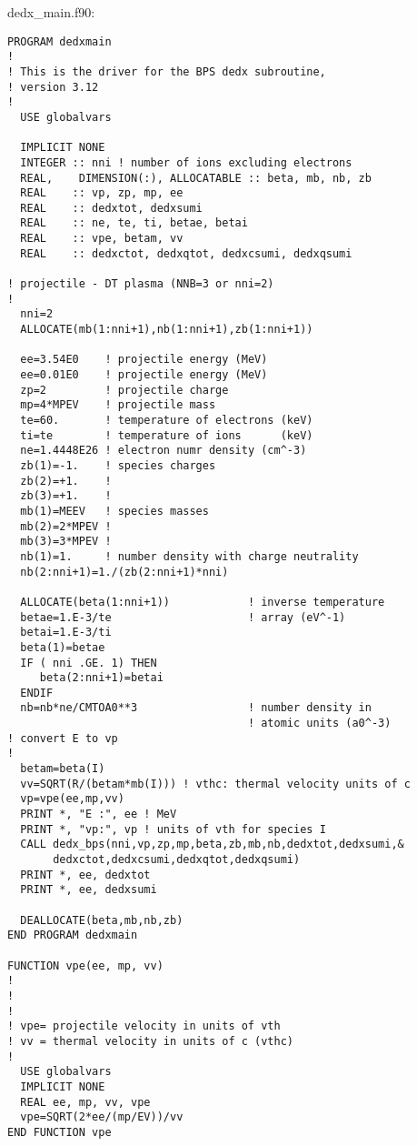 \documentclass[preprint,12pt,eqsecnum,nofootinbib,amsmath,amssymb]{revtex4}
\begin{document}
\vskip0.5cm
{
\noindent
dedx\_main.f90:
\baselineskip12pt
\begin{verbatim}
PROGRAM dedxmain
!
! This is the driver for the BPS dedx subroutine,
! version 3.12
!
  USE globalvars

  IMPLICIT NONE
  INTEGER :: nni ! number of ions excluding electrons
  REAL,    DIMENSION(:), ALLOCATABLE :: beta, mb, nb, zb
  REAL    :: vp, zp, mp, ee
  REAL    :: dedxtot, dedxsumi
  REAL    :: ne, te, ti, betae, betai
  REAL    :: vpe, betam, vv
  REAL    :: dedxctot, dedxqtot, dedxcsumi, dedxqsumi

! projectile - DT plasma (NNB=3 or nni=2)
!
  nni=2         
  ALLOCATE(mb(1:nni+1),nb(1:nni+1),zb(1:nni+1))

  ee=3.54E0    ! projectile energy (MeV)
  ee=0.01E0    ! projectile energy (MeV)
  zp=2         ! projectile charge
  mp=4*MPEV    ! projectile mass
  te=60.       ! temperature of electrons (keV)
  ti=te        ! temperature of ions      (keV)
  ne=1.4448E26 ! electron numr density (cm^-3)
  zb(1)=-1.    ! species charges
  zb(2)=+1.    !
  zb(3)=+1.    !
  mb(1)=MEEV   ! species masses
  mb(2)=2*MPEV !
  mb(3)=3*MPEV !
  nb(1)=1.     ! number density with charge neutrality
  nb(2:nni+1)=1./(zb(2:nni+1)*nni) 

  ALLOCATE(beta(1:nni+1))            ! inverse temperature
  betae=1.E-3/te                     ! array (eV^-1)
  betai=1.E-3/ti                      
  beta(1)=betae                      
  IF ( nni .GE. 1) THEN
     beta(2:nni+1)=betai  
  ENDIF              
  nb=nb*ne/CMTOA0**3                 ! number density in
                                     ! atomic units (a0^-3)
! convert E to vp 
!
  betam=beta(I)
  vv=SQRT(R/(betam*mb(I))) ! vthc: thermal velocity units of c
  vp=vpe(ee,mp,vv) 
  PRINT *, "E :", ee ! MeV
  PRINT *, "vp:", vp ! units of vth for species I
  CALL dedx_bps(nni,vp,zp,mp,beta,zb,mb,nb,dedxtot,dedxsumi,&
       dedxctot,dedxcsumi,dedxqtot,dedxqsumi)
  PRINT *, ee, dedxtot
  PRINT *, ee, dedxsumi

  DEALLOCATE(beta,mb,nb,zb)
END PROGRAM dedxmain
  
FUNCTION vpe(ee, mp, vv) 
!
! 
!
! vpe= projectile velocity in units of vth
! vv = thermal velocity in units of c (vthc)
!
  USE globalvars
  IMPLICIT NONE
  REAL ee, mp, vv, vpe
  vpe=SQRT(2*ee/(mp/EV))/vv
END FUNCTION vpe
\end{verbatim}
}
\end{document}
